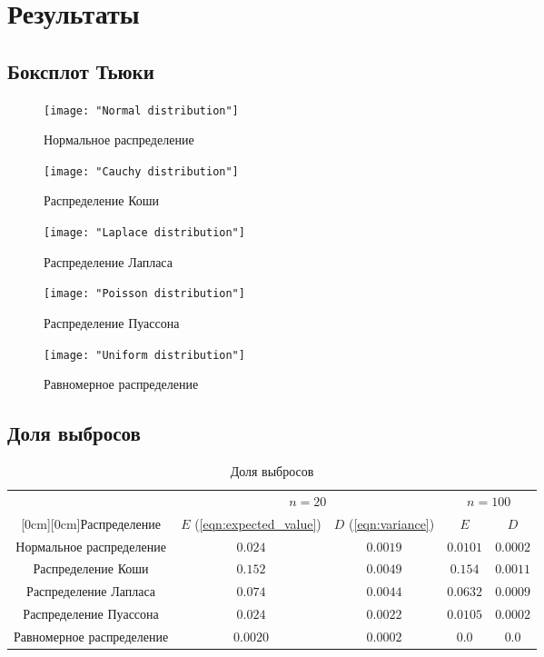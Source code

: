 \documentclass[12pt,a4paper]{article}
\begin{document}
	\section{Результаты}
	\subsection{Боксплот Тьюки}
	\begin{center}
		\begin{figure}[hp!]
			\texttt{[image: "Normal distribution"]} 
			\caption[Нормальное распределение]{Нормальное распределение}
			
			\texttt{[image: "Cauchy distribution"]}
			\caption[Распределение Коши]{Распределение Коши}
		\end{figure}
		
		\begin{figure}[hp!]
			\texttt{[image: "Laplace distribution"]}
			\caption[Распределение Лапласа]{Распределение Лапласа}
			
			\texttt{[image: "Poisson distribution"]}
			\caption[Распределение Пуассона]{Распределение Пуассона}
		\end{figure}
	
		\begin{figure}[h!]
			\texttt{[image: "Uniform distribution"]}
			\caption[Равномерное распределение]{Равномерное распределение}
		\end{figure}
	\end{center}
	
	\newpage
	\subsection{Доля выбросов}
	\begin{center}
		\begin{table}[h]
			\caption{Доля выбросов}
			\begin{center}
				\begin{tabular}{|c|c|c|c|c|}
					\hline
					& \multicolumn{2}{c|}{$n=20$} & \multicolumn{2}{c|}{$n=100$}\\
					\cline{2-5}
					\raisebox{1.5ex}[0cm][0cm]{Распределение}
					& $E$ (\ref{eqn:expected_value}) & $D$ (\ref{eqn:variance}) & $E$ & $D$\\
					\hline
					Нормальное распределение & $0.024$ & $0.0019$ & $0.0101$ & $0.0002$ \\
					\hline
					Распределение Коши & $0.152$ & $0.0049$ & $0.154$ & $0.0011$\\
					\hline
					Распределение Лапласа & $0.074$ & $0.0044$ & $0.0632$ & $0.0009$\\
					\hline
					Распределение Пуассона & $0.024$ & $0.0022$ & $0.0105$ & $0.0002$\\
					\hline
					Равномерное распределение & $0.0020$ & $0.0002$ & $0.0$ & $0.0$\\
					\hline
				\end{tabular}
			\end{center}
		\end{table}
	\end{center}
	
\end{document}

